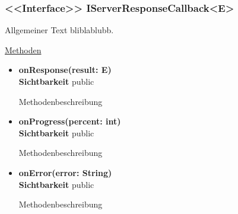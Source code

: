 \subsubsection{<<Interface>> IServerResponseCallback<E>} \label{app:klasse:IServerResponseCallback}
Allgemeiner Text bliblablubb. \newline

\underline{Methoden}
\begin{itemize}
\itemsep0pt
\item \textbf{onResponse(result: E)}\hfill\\
\textbf{Sichtbarkeit} public

Methodenbeschreibung

\item \textbf{onProgress(percent: int)}\hfill\\
\textbf{Sichtbarkeit} public

Methodenbeschreibung

\item \textbf{onError(error: String)}\hfill\\
\textbf{Sichtbarkeit} public

Methodenbeschreibung

\end{itemize}